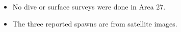 \begin{itemize}

\item No dive or surface surveys were done in Area 27.

\item The three reported spawns are from satellite images.

\end{itemize}